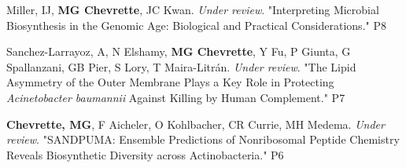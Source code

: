 \begin{cvpubs}


    


  \cvpub
    {Miller, IJ, \textbf{MG Chevrette}, JC Kwan.  \textit{Under review}. "Interpreting Microbial Biosynthesis in the Genomic Age: Biological and Practical Considerations."} %
    {P8} %

  \cvpub
    {Sanchez-Larrayoz, A, N Elshamy, \textbf{MG Chevrette}, Y Fu, P Giunta, G Spallanzani, GB Pier, S Lory, T Maira-Litr\'{a}n.  \textit{Under review}. "The Lipid Asymmetry of the Outer Membrane Plays a Key Role in Protecting \textit{Acinetobacter baumannii} Against Killing by Human Complement."} %
    {P7} %
    

  \cvpub
    {\textbf{Chevrette, MG}, F Aicheler, O Kohlbacher, CR Currie, MH Medema. \textit{Under review}. "SANDPUMA: Ensemble Predictions of Nonribosomal Peptide Chemistry Reveals Biosynthetic Diversity across Actinobacteria."} %
    {P6} %
    

\end{cvpubs}
